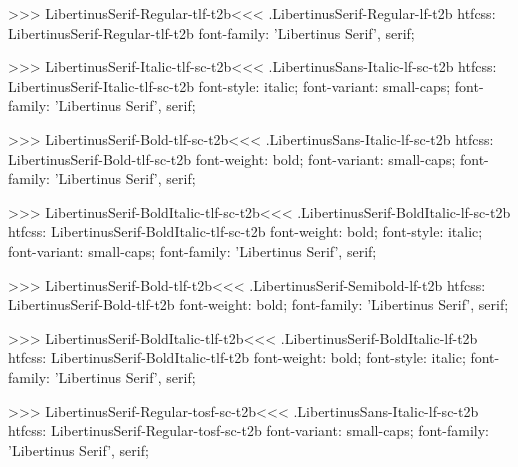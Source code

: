 {{{{{{{{{{>>>
\<LibertinusSerif-Regular-tlf-t2b\><<<
.LibertinusSerif-Regular-lf-t2b
htfcss:  LibertinusSerif-Regular-tlf-t2b  font-family: 'Libertinus Serif', serif;

>>>
\<LibertinusSerif-Italic-tlf-sc-t2b\><<<
.LibertinusSans-Italic-lf-sc-t2b
htfcss:  LibertinusSerif-Italic-tlf-sc-t2b  font-style: italic; font-variant: small-caps; font-family: 'Libertinus Serif', serif;

>>>
\<LibertinusSerif-Bold-tlf-sc-t2b\><<<
.LibertinusSans-Italic-lf-sc-t2b
htfcss:  LibertinusSerif-Bold-tlf-sc-t2b  font-weight: bold; font-variant: small-caps; font-family: 'Libertinus Serif', serif;

>>>
\<LibertinusSerif-BoldItalic-tlf-sc-t2b\><<<
.LibertinusSerif-BoldItalic-lf-sc-t2b
htfcss:  LibertinusSerif-BoldItalic-tlf-sc-t2b  font-weight: bold; font-style: italic; font-variant: small-caps; font-family: 'Libertinus Serif', serif;

>>>
\<LibertinusSerif-Bold-tlf-t2b\><<<
.LibertinusSerif-Semibold-lf-t2b
htfcss:  LibertinusSerif-Bold-tlf-t2b  font-weight: bold; font-family: 'Libertinus Serif', serif;

>>>
\<LibertinusSerif-BoldItalic-tlf-t2b\><<<
.LibertinusSerif-BoldItalic-lf-t2b
htfcss:  LibertinusSerif-BoldItalic-tlf-t2b  font-weight: bold; font-style: italic; font-family: 'Libertinus Serif', serif;

>>>
\<LibertinusSerif-Regular-tosf-sc-t2b\><<<
.LibertinusSans-Italic-lf-sc-t2b
htfcss:  LibertinusSerif-Regular-tosf-sc-t2b  font-variant: small-caps; font-family: 'Libertinus Serif', serif;

}}}}}}}}}}

